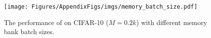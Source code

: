 \begin{figure}[ht]
  \centering
  \texttt{[image: Figures/AppendixFigs/imgs/memory\_batch\_size.pdf]}
  \caption{The performance of \frameworkName on CIFAR-10 ($M=0.2k$) with different memory bank batch sizes.}
  \label{fig:memoryBankBatchSize}
\end{figure}
